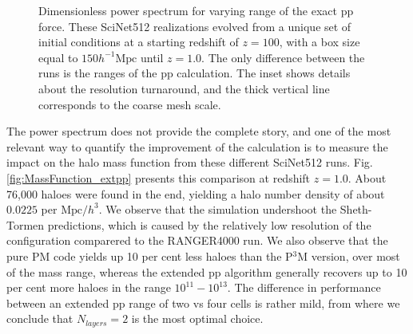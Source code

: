 \documentclass[useAMS,usenatbib]{mn2e}
\begin{document}
\begin{figure}
  \begin{center}
  \caption{ Dimensionless power spectrum for varying range of the exact pp force.
  These SciNet512 realizations evolved from a unique set of initial conditions at a starting redshift of $z = 100$, with a box size equal to $ 150 h^{-1}\mbox{Mpc}$ 
  until $z=1.0$. The only difference between the runs is the ranges of the pp calculation. The inset shows details about the resolution turnaround, and the
  thick vertical line corresponds to the coarse mesh scale. }
    \label{fig:power}
  \end{center}
\end{figure}



The power spectrum does not provide the complete story, and one of the most relevant way to quantify the improvement of the calculation is to measure the impact on the halo mass function from these different SciNet512 runs. Fig. \ref{fig:MassFunction_extpp} presents this comparison at redshift $z = 1.0$. About 76,000 haloes were found in the end, yielding a halo number density of about $0.0225$ per $\mbox{Mpc/$h$}^{3}$. 
We observe that the simulation undershoot the Sheth-Tormen predictions, which is caused by the relatively low resolution of the configuration
comparered to the RANGER4000 run. 
We also observe that the pure PM code yields up 10 per cent less haloes than the P$^{3}$M version, over most of the mass range,
whereas the extended pp algorithm generally recovers  up to 10 per cent more haloes in the range $10^{11} - 10^{13}$.
The difference in performance between an extended pp  range of two vs four cells is rather mild, from where
we conclude that $N_{layers} = 2$ is the most optimal choice.
\end{document}
